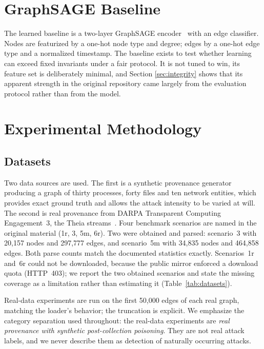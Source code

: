 \documentclass[journal]{IEEEtran}
\begin{document}
\section{GraphSAGE Baseline}
\label{sec:graphsage}
The learned baseline is a two-layer GraphSAGE encoder~\cite{hamilton2017graphsage}
with an edge classifier. Nodes are featurized by a one-hot node type and degree;
edges by a one-hot edge type and a normalized timestamp. The baseline exists to
test whether learning can exceed fixed invariants under a fair protocol. It is
not tuned to win, its feature set is deliberately minimal, and Section
\ref{sec:integrity} shows that its apparent strength in the original repository
came largely from the evaluation protocol rather than from the model.

\section{Experimental Methodology}
\label{sec:protocol}
\subsection{Datasets}
\label{sec:datasets}
Two data sources are used. The first is a synthetic provenance generator
producing a graph of thirty processes, forty files and ten network entities,
which provides exact ground truth and allows the attack intensity to be varied
at will. The second is real provenance from DARPA Transparent Computing
Engagement~3, the Theia streams~\cite{darpa2020tc}. Four benchmark scenarios are
named in the original material (1r, 3, 5m, 6r). Two were obtained and parsed:
scenario~3 with 20{,}157 nodes and 297{,}777 edges, and scenario~5m with 34{,}835
nodes and 464{,}858 edges. Both parse counts match the documented statistics
exactly. Scenarios~1r and~6r could not be downloaded, because the public mirror
enforced a download quota (HTTP~403); we report the two obtained scenarios and
state the missing coverage as a limitation rather than estimating it
(Table~\ref{tab:datasets}).

Real-data experiments are run on the first 50{,}000 edges of each real graph,
matching the loader's behavior; the truncation is explicit. We emphasize the
category separation used throughout: the real-data experiments are \emph{real
provenance with synthetic post-collection poisoning}. They are not real attack
labels, and we never describe them as detection of naturally occurring attacks.
\end{document}
